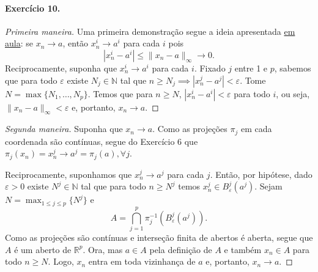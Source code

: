\documentclass[12pt,a4paper]{article}
\begin{document}
\paragraph{Exercício 10.}
\begin{proof}[Primeira maneira]
    Uma primeira demonstração segue a ideia apresentada
    \href{https://www.youtube.com/watch?v=ph3VUO0AVRA&list=PLMG2ETzS-iy95U-hwPhPRSGRHBFm8Dk2x&index=5}{em aula}: se $x_n \to a$, então
    $x_n^i \to a^i$ para cada $i$ pois
    \begin{equation*}
        |x_n^i - a^i| \leq \|x_n - a\|_{\infty} \to 0.
    \end{equation*}
    Reciprocamente, suponha que $x_n^i \to a^i$ para cada $i$. Fixado $j$ entre 1 e $p$, sabemos que para todo $\varepsilon$ existe
    $N_j\in\mathbb{N}$ tal que $n\geq N_j \implies |x_n^j - a^j| < \varepsilon$. Tome $N = \max\{N_1, \dots, N_p\}$. Temos que
    para $n\geq N$, $|x_n^i - a^i| < \varepsilon$ para todo $i$, ou seja, $\|x_n - a\|_{\infty} < \varepsilon$ e, portanto, 
    $x_n \to a$.
\end{proof}

\begin{proof}[Segunda maneira]
    Suponha que $x_n \to a$. Como as projeções $\pi_j$ em cada coordenada são contínuas,
    segue do Exercício 6 que $\pi_j(x_n) = x_n^j \to a^j = \pi_j(a), \forall j$. 
    
    Reciprocamente, suponhamos que $x_n^j \to a^j$ para cada $j$. Então, por hipótese, dado $\varepsilon > 0$ existe
    $N^j\in\mathbb{N}$ tal que para todo $n\geq N^j$ temos $x_n^j \in B_{\varepsilon}^j(a^j)$. 
    Sejam $N = \max_{1\leq j\leq p}\{N^j\}$ e
    \begin{equation*}
        A = \bigcap_{j=1}^p \pi_j^{-1}(B_{\varepsilon}^j(a^j)).
    \end{equation*}
    Como as projeções são contínuas e interseção finita de abertos é aberta, segue que $A$ é um aberto de $\mathbb{R}^p$.
    Ora, mas $a\in A$ pela definição de $A$ e também $x_n \in A$ para todo $n\geq N$. Logo, $x_n$ entra em toda vizinhança
    de $a$ e, portanto, $x_n \to a$.
\end{proof}
\end{document}
